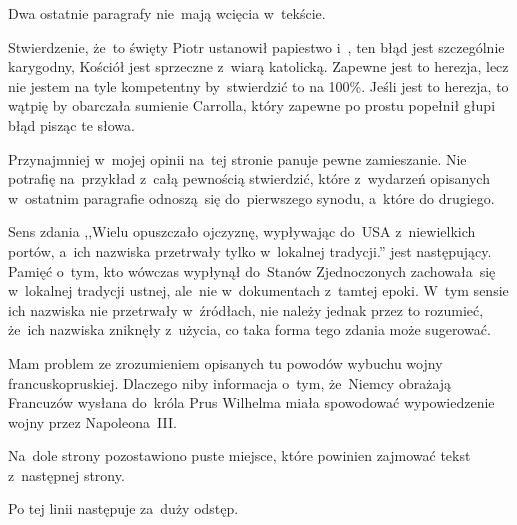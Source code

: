 \documentclass[a4paper,11pt]{article}
\begin{document}
\vspace{\spaceFour}


\start {} Dwa ostatnie paragrafy nie~mają wcięcia w~tekście.

\vspace{\spaceFour}


\start {} Stwierdzenie, że~to święty Piotr ustanowił papiestwo
i~, ten błąd jest szczególnie karygodny, Kościół jest sprzeczne
z~wiarą katolicką. Zapewne jest to herezja, lecz nie jestem na tyle
kompetentny by~stwierdzić to na 100\%. Jeśli jest to herezja, to
wątpię by obarczała sumienie Carrolla, który zapewne po prostu
popełnił głupi błąd pisząc te słowa.

\vspace{\spaceFour}


\start {} Przynajmniej w~mojej opinii na~tej stronie panuje
pewne zamieszanie. Nie potrafię na~przykład z~całą pewnością
stwierdzić, które z~wydarzeń opisanych w~ostatnim paragrafie
odnoszą~się do~pierwszego synodu, a~które do drugiego.

\vspace{\spaceFour}


\start {} Sens zdania ,,Wielu opuszczało ojczyznę,
wypływając do~USA z~niewielkich portów, a~ich nazwiska przetrwały
tylko w~lokalnej tradycji.'' jest następujący. Pamięć o~tym, kto
wówczas wypłynął do~Stanów Zjednoczonych zachowała~się w~lokalnej
tradycji ustnej, ale~nie w~dokumentach z~tamtej epoki. W~tym sensie
ich nazwiska nie przetrwały w~źródłach, nie należy jednak przez to
rozumieć, że~ich nazwiska zniknęły z~użycia, co taka forma tego zdania
może sugerować.

\vspace{\spaceFour}


\start {} Mam problem ze zrozumieniem opisanych tu powodów
wybuchu wojny francusko\dywiz pruskiej. Dlaczego niby informacja
o~tym, że~Niemcy obrażają Francuzów wysłana do~króla Prus Wilhelma
miała spowodować wypowiedzenie wojny przez Napoleona~III.

\vspace{\spaceFour}


\start {} Na~dole strony pozostawiono puste miejsce, które
powinien zajmować tekst z~następnej strony.

\vspace{\spaceFour}


\start {} Po tej linii następuje za~duży odstęp.

\vspace{\spaceFour}
\end{document}
